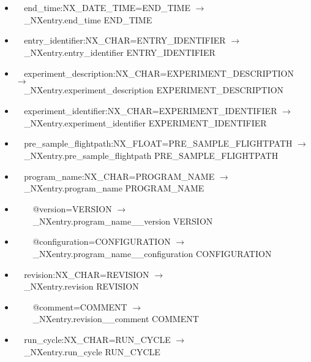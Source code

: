\documentclass[11pt]{article}
\begin{document}
{{\begin{itemize}
\item{\verb|  |end\_time:NX\_DATE\_TIME=END\_TIME $\rightarrow$\\
\verb|  |\_NXentry.end\_time END\_TIME}

\item{\verb|  |entry\_identifier:NX\_CHAR=ENTRY\_IDENTIFIER $\rightarrow$\\
\verb|  |\_NXentry.entry\_identifier ENTRY\_IDENTIFIER}

\item{\verb|  |experiment\_description:NX\_CHAR=EXPERIMENT\_DESCRIPTION $\rightarrow$\\
\verb|  |\_NXentry.experiment\_description EXPERIMENT\_DESCRIPTION}

\item{\verb|  |experiment\_identifier:NX\_CHAR=EXPERIMENT\_IDENTIFIER $\rightarrow$\\
\verb|  |\_NXentry.experiment\_identifier EXPERIMENT\_IDENTIFIER}

\item{\verb|  |pre\_sample\_flightpath:NX\_FLOAT=PRE\_SAMPLE\_FLIGHTPATH $\rightarrow$\\
\verb|  |\_NXentry.pre\_sample\_flightpath PRE\_SAMPLE\_FLIGHTPATH}

\item{\verb|  |program\_name:NX\_CHAR=PROGRAM\_NAME $\rightarrow$\\
\verb|  |\_NXentry.program\_name PROGRAM\_NAME}

\item{\verb|    |@version=VERSION $\rightarrow$\\
\verb|    |\_NXentry.program\_name\_\_version VERSION}

\item{\verb|    |@configuration=CONFIGURATION $\rightarrow$\\
\verb|    |\_NXentry.program\_name\_\_configuration CONFIGURATION}

\item{\verb|  |revision:NX\_CHAR=REVISION $\rightarrow$\\
\verb|  |\_NXentry.revision REVISION}

\item{\verb|    |@comment=COMMENT $\rightarrow$\\
\verb|    |\_NXentry.revision\_\_comment COMMENT}

\item{\verb|  |run\_cycle:NX\_CHAR=RUN\_CYCLE $\rightarrow$\\
\verb|  |\_NXentry.run\_cycle RUN\_CYCLE}


\end{itemize}}}
\end{document}
